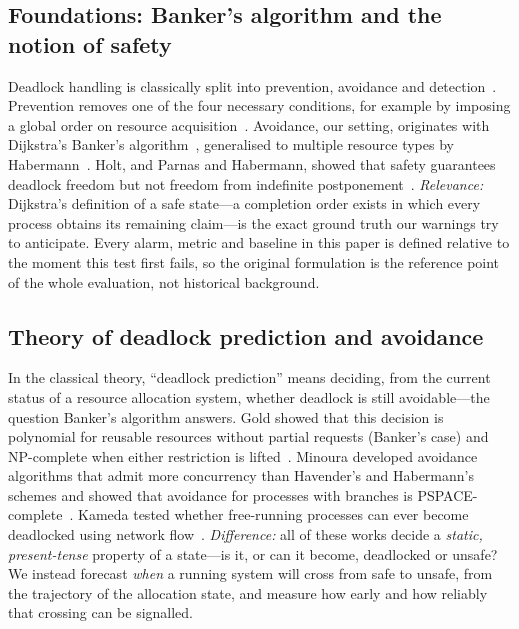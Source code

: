 \documentclass[conference]{IEEEtran}
\begin{document}
\subsection{Foundations: Banker's algorithm and the notion of safety}
Deadlock handling is classically split into prevention, avoidance and detection~\cite{Coffman1971,Holt1972}. Prevention removes one of the four necessary conditions, for example by imposing a global order on resource acquisition~\cite{Havender1968}. Avoidance, our setting, originates with Dijkstra's Banker's algorithm~\cite{Dijkstra-EWD123,Dijkstra-EWD623}, generalised to multiple resource types by Habermann~\cite{Habermann1969}. Holt, and Parnas and Habermann, showed that safety guarantees deadlock freedom but not freedom from indefinite postponement~\cite{Holt1971,ParnasHabermann1972}. \emph{Relevance:} Dijkstra's definition of a safe state---a completion order exists in which every process obtains its remaining claim---is the exact ground truth our warnings try to anticipate. Every alarm, metric and baseline in this paper is defined relative to the moment this test first fails, so the original formulation is the reference point of the whole evaluation, not historical background.

\subsection{Theory of deadlock prediction and avoidance}
In the classical theory, ``deadlock prediction'' means deciding, from the current status of a resource allocation system, whether deadlock is still avoidable---the question Banker's algorithm answers. Gold showed that this decision is polynomial for reusable resources without partial requests (Banker's case) and NP-complete when either restriction is lifted~\cite{Gold1978}. Minoura developed avoidance algorithms that admit more concurrency than Havender's and Habermann's schemes and showed that avoidance for processes with branches is PSPACE-complete~\cite{Minoura1982}. Kameda tested whether free-running processes can ever become deadlocked using network flow~\cite{Kameda1980}. \emph{Difference:} all of these works decide a \emph{static, present-tense} property of a state---is it, or can it become, deadlocked or unsafe? We instead forecast \emph{when} a running system will cross from safe to unsafe, from the trajectory of the allocation state, and measure how early and how reliably that crossing can be signalled.
\end{document}
